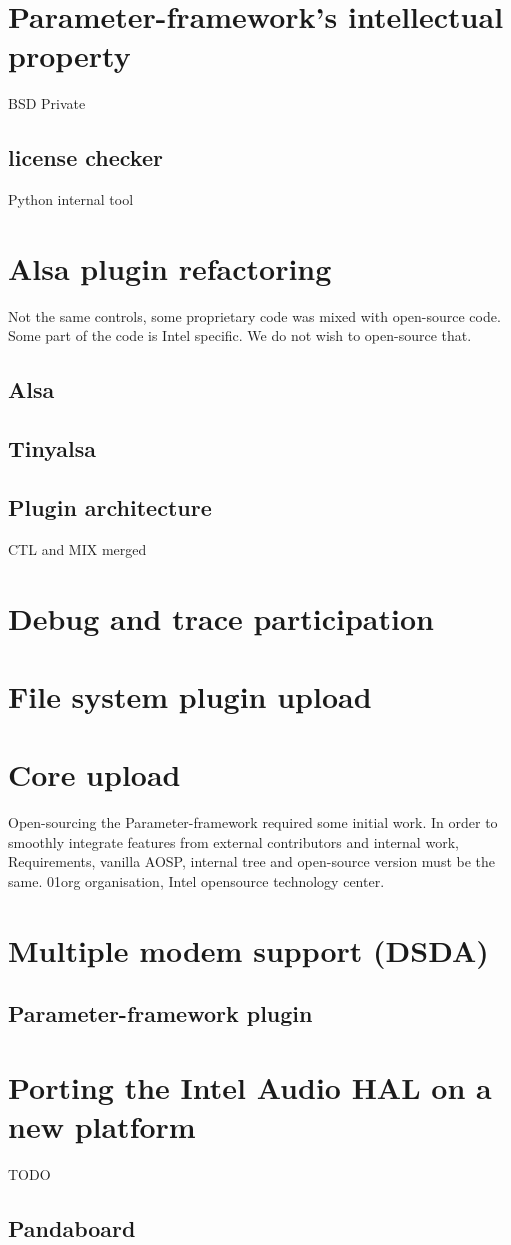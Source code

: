 \section{Parameter-framework's intellectual property}
BSD
Private
\subsection{license checker}
Python internal tool

\section{Alsa plugin refactoring}
Not the same controls, some proprietary code was mixed with open-source code.
Some part of the code is Intel specific. We do not wish to open-source that.

\subsection{Alsa}
\subsection{Tinyalsa}
\subsection{Plugin architecture}
CTL and MIX merged

\section{Debug and trace participation}

\section{File system plugin upload}

\section{Core upload}
Open-sourcing the Parameter-framework required some initial work.
In order to smoothly integrate features from external contributors and internal work,
Requirements, vanilla AOSP, internal tree and open-source version must be the
same.
01org organisation, Intel opensource technology center.

\section{Multiple modem support (DSDA)}
\subsection{Parameter-framework plugin}

\section{Porting the Intel Audio HAL on a new platform}
TODO
\subsection{Pandaboard}

